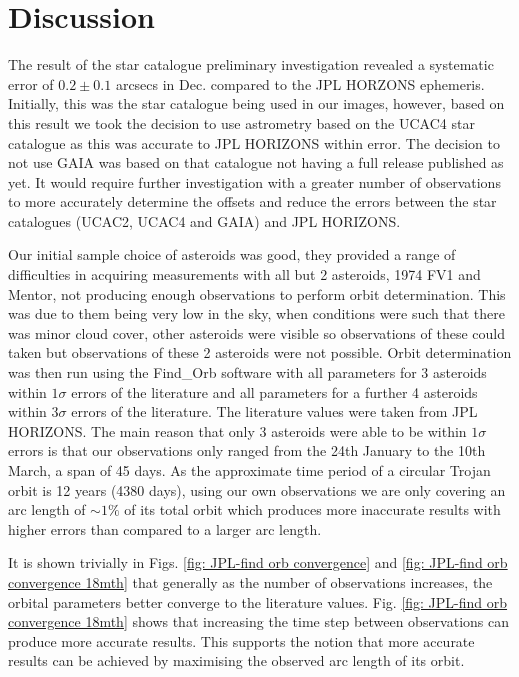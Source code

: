 \documentclass[10pt, twocolumn]{revtex4}    %
\begin{document}
\section{Discussion}

The result of the star catalogue preliminary investigation revealed a systematic error of $0.2\pm0.1$ arcsecs in Dec. compared to the JPL HORZONS ephemeris. Initially, this was the star catalogue being used in our images, however, based on this result we took the decision to use astrometry based on the UCAC4 star catalogue as this was accurate to JPL HORIZONS within error. The decision to not use GAIA was based on that catalogue not having a full release published as yet. It would require further investigation with a greater number of observations to more accurately determine the offsets and reduce the errors between the star catalogues (UCAC2, UCAC4 and GAIA) and JPL HORIZONS.

Our initial sample choice of asteroids was good, they provided a range of difficulties in acquiring measurements with all but 2 asteroids, 1974 FV1 and Mentor, not producing enough observations to perform orbit determination. This was due to them being very low in the sky, when conditions were such that there was minor cloud cover, other asteroids were visible so observations of these could taken but observations of these 2 asteroids were not possible. Orbit determination was then run using the Find\_Orb software with all parameters for 3 asteroids within $1\sigma$ errors of the literature and all parameters for a further 4 asteroids within $3\sigma$ errors of the literature. The literature values were taken from JPL HORIZONS. The main reason that only 3 asteroids were able to be within $1\sigma$ errors is that our observations only ranged from the 24th January to the 10th March, a span of 45 days. As the approximate time period of a circular Trojan orbit is 12 years (4380 days), using our own observations we are only covering an arc length of ${\sim}1\%$ of its total orbit which produces more inaccurate results with higher errors than compared to a larger arc length.

It is shown trivially in Figs. \ref{fig: JPL-find orb convergence} and \ref{fig: JPL-find orb convergence 18mth} that generally as the number of observations increases, the orbital parameters better converge to the literature values. Fig. \ref{fig: JPL-find orb convergence 18mth} shows that increasing the time step between observations can produce more accurate results. This supports the notion that more accurate results can be achieved by maximising the observed arc length of its orbit.
\end{document}
